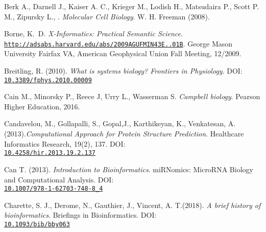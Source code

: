 \documentclass[twoside,openright,titlepage,fleqn,
,	headinclude,12pt,a4paper,BCOR5mm,footinclude,table]{scrbook}
\newcommand{\?}{'\-\nobreak\hspace{0pt}}
\begin{document}
\begin{thebibliography}{60}
Berk A., Darnell J., Kaiser A. C., Krieger M., Lodish H., Matsudaira P., Scott P. M., Zipursky L., . \newline
\textit{Molecular Cell Biology}.\newline
W. H. Freeman (2008).

Borne, K.~D.\newline
\textit{X-Informatics: Practical Semantic Science}.
\\\texttt{\url{http://adsabs.harvard.edu/abs/2009AGUFMIN43E..01B}}. \newline
George Mason University Fairfax VA, American Geophysical Union Fall Meeting, 12/2009.

Breitling, R. (2010). \newline
\textit{What is systems biology? Frontiers in Physiology}.\newline
DOI: \\\texttt{\url{10.3389/fphys.2010.00009}}

Cain M., Minorsky P., Reece J, Urry L., Wasserman S. \newline
\textit{Campbell biology}. \newline
Pearson Higher Education, 2016.


Candavelou, M., Gollapalli, S., Gopal,J., Karthikeyan, K., Venkatesan, A.(2013).\newline \textit{Computational Approach for Protein Structure Prediction}.\newline
Healthcare Informatics Research, 19(2), 137. \newline
DOI: \\\texttt{\url{10.4258/hir.2013.19.2.137}}

Can T. (2013).\newline
\textit{Introduction to Bioinformatics}.\newline
miRNomics: MicroRNA Biology and Computational Analysis.\newline
DOI: \\\texttt{\url{10.1007/978-1-62703-748-8_4}}

Charette, S. J., Derome, N., Gauthier, J., Vincent, A. T.(2018). \newline
\textit{A brief history of bioinformatics}. \newline
Briefings in Bioinformatics.\newline
DOI: \\\texttt{\url{10.1093/bib/bby063}}


\end{thebibliography}
\end{document}
